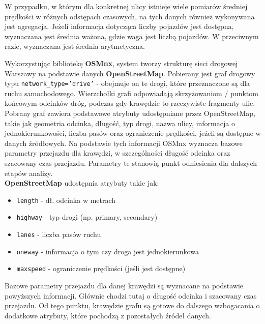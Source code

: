 \documentclass[12pt]{article}
\begin{document}
W przypadku, w którym dla konkretnej ulicy istnieje wiele pomiarów średniej prędkości w różnych odstępach czasowych, na tych danych również wykonywana
jest agregacja. Jeżeli informacja dotycząca liczby pojazdów jest dostępna, wyznaczana jest średnia ważona, gdzie waga jest liczbą pojazdów. W przeciwnym
razie, wyznaczana jest średnia arytmetyczna.

\newpage


Wykorzystując bibliotekę \textbf{OSMnx}, system tworzy strukturę sieci drogowej Warszawy na podstawie danych \textbf{OpenStreetMap}. Pobierany jest graf drogowy typu \texttt{network\_type='drive'} - obejmuje on te drogi, które przeznaczone są dla ruchu samochodowego. Wierzchołki grafi odpowiadają skrzyżowaniom / punktom końcowym odcinków dróg, podczas gdy krawędzie to rzeczywiste fragmenty ulic.\\

Pobrany graf zawiera podstawowe atrybuty udostępniane przez OpenStreetMap, takie jak geometria odcinka, długość, typ drogi, nazwa ulicy, informacja o jednokierunkowości, liczba pasów oraz ograniczenie prędkości, jeżeli są dostępne w danych źródłowych. Na podstawie tych informacji OSMnx wyznacza bazowe parametry przejazdu dla krawędzi, w szczególności długość odcinka oraz szacowany czas przejazdu. Parametry te stanowią punkt odniesienia dla dalszych etapów analizy.\\

\textbf{OpenStreetMap} udostępnia atrybuty takie jak:
\begin{itemize}
    \item \texttt{length} - dł. odcinka w metrach
    \item \texttt{highway} - typ drogi (np. primary, secondary)
    \item \texttt{lanes} - liczba pasów ruchu
    \item \texttt{oneway} - informacja o tym czy droga jest jednokierunkowa
    \item \texttt{maxspeed} - ograniczenie prędkości (jeśli jest dostępne)
\end{itemize}

Bazowe parametry przejazdu dla danej krawędzi są wyznacane na podstawie powyższych informacji. Głównie chodzi tutaj o długość odcinka i szacowany czas przejazdu. Od tego punktu, krawędzie grafu są gotowe do dalszego wzbogacania o dodatkowe atrybuty, które pochodzą z pozostałych źródeł danych.\\
\end{document}
